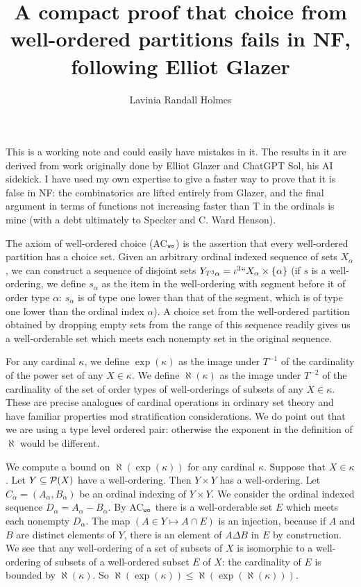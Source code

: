 \documentclass[12pt]{article}
\title{A compact proof that choice from well-ordered partitions fails in NF, following Elliot Glazer}
\author{Lavinia Randall Holmes}
\begin{document}
\maketitle

This is a working note and could easily have mistakes in it.  The results in it are derived from work originally done by Elliot Glazer and ChatGPT Sol, his AI sidekick.  I have used my own expertise to give a faster way to prove that it is false in NF:  the combinatorics are lifted entirely from Glazer, and the final argument in terms of functions not increasing faster than T in the ordinals is mine (with a debt ultimately to Specker and C. Ward Henson).

The axiom of well-ordered choice (AC$_{\tt wo}$) is the assertion that every well-ordered partition has a choice set.
Given an arbitrary ordinal indexed sequence of sets $X_\alpha$, we can construct a sequence of disjoint
sets $Y_{T^3\alpha}=\iota^3``X_\alpha \times \{\alpha\}$ (if $s$ is a well-ordering, we define $s_{\alpha}$ as the item in the well-ordering with segment before it of order type $\alpha$: $s_\alpha$ is of type one lower than that of the segment, which is of type one lower than the ordinal index $\alpha$).
A choice set from the well-ordered partition obtained by dropping empty sets from the range of this sequence readily gives us a well-orderable set which meets each nonempty set in the original sequence.

For any cardinal $\kappa$, we define $\exp(\kappa)$ as the image under $T^{-1}$ of the cardinality of the power set of any  $X\in \kappa$.  We define $\aleph(\kappa)$ as the image under $T^{-2}$ of the
cardinality of the set of order types of well-orderings of subsets of any $X \in \kappa$.  These are precise analogues of cardinal operations in ordinary set theory and have familiar properties mod stratification considerations.  We do point out that we are using a type level ordered pair:  otherwise the exponent in the definition of $\aleph$ would be different.

We compute a bound on $\aleph(\exp(\kappa))$ for any cardinal $\kappa$.   Suppose that $X \in \kappa$.
Let $Y \subseteq {\cal P}(X)$ have a well-ordering.   Then $Y \times Y$ has a well-ordering.  Let $C_\alpha = (A_\alpha,B_\alpha)$ be an ordinal indexing of $Y\times Y$.  We consider the ordinal indexed sequence $D_\alpha=A_\alpha-B_\alpha$.  By AC$_{\tt wo}$ there is a well-orderable set $E$ which meets each nonempty $D_\alpha$.  The map $(A \in Y \mapsto A \cap E)$ is an injection, because if $A$ and $B$ are distinct elements of $Y$, there is an element of $A \Delta B$ in $E$ by construction.  We see that any well-ordering of a set of subsets of $X$ is isomorphic to a well-ordering of subsets of a well-ordered subset $E$ of $X$:  the cardinality of $E$ is bounded by $\aleph(\kappa)$.
So $\aleph(\exp(\kappa)) \leq \aleph(\exp(\aleph(\kappa)))$.
\end{document}
